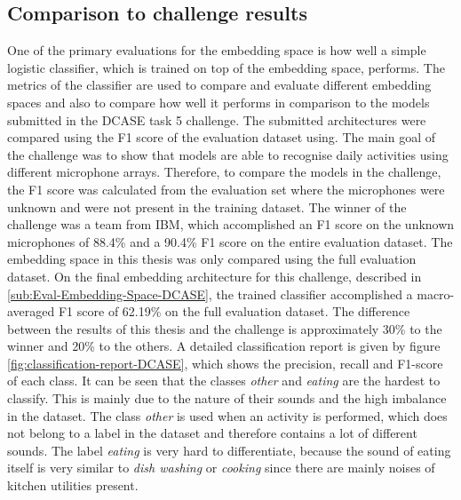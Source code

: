 \subsection{Comparison to challenge results}
\label{sub:Eval-Comparison-DCASE}
One of the primary evaluations for the embedding space is how well a simple logistic classifier, which is trained on top of the embedding space, performs. The metrics of the classifier are used to compare and evaluate different embedding spaces and also to compare how well it performs in comparison to the models submitted in the DCASE task 5 challenge. The submitted architectures were compared using the F1 score of the evaluation dataset using. The main goal of the challenge was to show that models are able to recognise daily activities using different microphone arrays. Therefore, to compare the models in the challenge, the F1 score was calculated from the evaluation set where the microphones were unknown and were not present in the training dataset. The winner of the challenge was a team from IBM, which accomplished an F1 score on the unknown microphones of 88.4\% and a 90.4\% F1 score on the entire evaluation dataset. The embedding space in this thesis was only compared using the full evaluation dataset.
\newline
\newline
On the final embedding architecture for this challenge, described in \ref{sub:Eval-Embedding-Space-DCASE}, the trained classifier accomplished a macro-averaged F1 score of 62.19\% on the full evaluation dataset. The difference between the results of this thesis and the challenge is approximately 30\% to the winner and 20\% to the others. A detailed classification report is given by figure \ref{fig:classification-report-DCASE}, which shows the precision, recall and F1-score of each class. It can be seen that the classes \textit{other} and \textit{eating} are the hardest to classify. This is mainly due to the nature of their sounds and the high imbalance in the dataset. The class \textit{other} is used when an activity is performed, which does not belong to a label in the dataset and therefore contains a lot of different sounds. The label \textit{eating} is very hard to differentiate, because the sound of eating itself is very similar to \textit{dish washing} or \textit{cooking} since there are mainly noises of kitchen utilities present.
